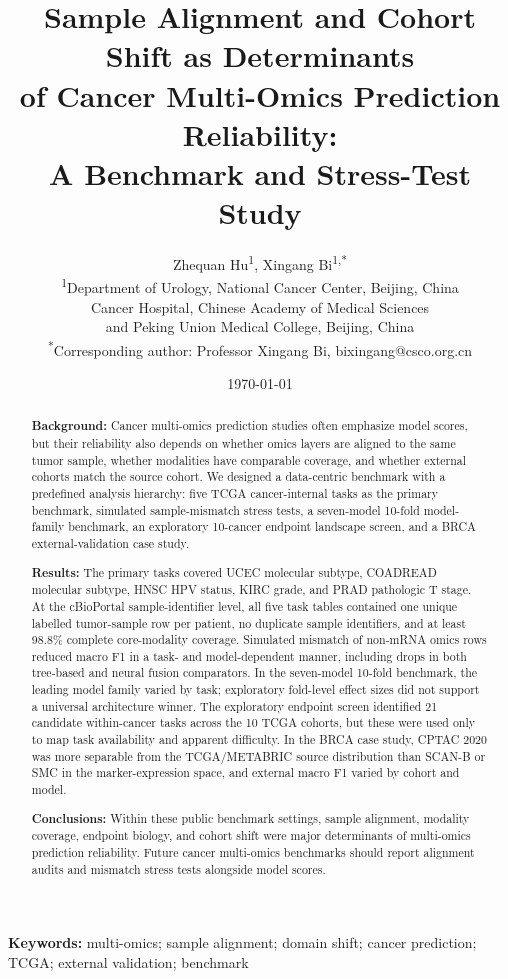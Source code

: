 \documentclass[11pt]{article}
\title{Sample Alignment and Cohort Shift as Determinants\\of Cancer Multi-Omics Prediction Reliability:\\A Benchmark and Stress-Test Study}
\author{
Zhequan Hu\textsuperscript{1},
Xingang Bi\textsuperscript{1,*}\\
\textsuperscript{1}Department of Urology, National Cancer Center, Beijing, China\\
Cancer Hospital, Chinese Academy of Medical Sciences\\
and Peking Union Medical College, Beijing, China\\
\textsuperscript{*}Corresponding author: Professor Xingang Bi, bixingang@csco.org.cn
}
\date{\today}
\begin{document}
\maketitle

\begin{abstract}
\textbf{Background:} Cancer multi-omics prediction studies often emphasize model scores, but their reliability also depends on whether omics layers are aligned to the same tumor sample, whether modalities have comparable coverage, and whether external cohorts match the source cohort. We designed a data-centric benchmark with a predefined analysis hierarchy: five TCGA cancer-internal tasks as the primary benchmark, simulated sample-mismatch stress tests, a seven-model 10-fold model-family benchmark, an exploratory 10-cancer endpoint landscape screen, and a BRCA external-validation case study.

\textbf{Results:} The primary tasks covered UCEC molecular subtype, COADREAD molecular subtype, HNSC HPV status, KIRC grade, and PRAD pathologic T stage. At the cBioPortal sample-identifier level, all five task tables contained one unique labelled tumor-sample row per patient, no duplicate sample identifiers, and at least 98.8\% complete core-modality coverage. Simulated mismatch of non-mRNA omics rows reduced macro F1 in a task- and model-dependent manner, including drops in both tree-based and neural fusion comparators. In the seven-model 10-fold benchmark, the leading model family varied by task; exploratory fold-level effect sizes did not support a universal architecture winner. The exploratory endpoint screen identified 21 candidate within-cancer tasks across the 10 TCGA cohorts, but these were used only to map task availability and apparent difficulty. In the BRCA case study, CPTAC 2020 was more separable from the TCGA/METABRIC source distribution than SCAN-B or SMC in the marker-expression space, and external macro F1 varied by cohort and model.

\textbf{Conclusions:} Within these public benchmark settings, sample alignment, modality coverage, endpoint biology, and cohort shift were major determinants of multi-omics prediction reliability. Future cancer multi-omics benchmarks should report alignment audits and mismatch stress tests alongside model scores.
\end{abstract}

\noindent\textbf{Keywords:} multi-omics; sample alignment; domain shift; cancer prediction; TCGA; external validation; benchmark










\end{document}
